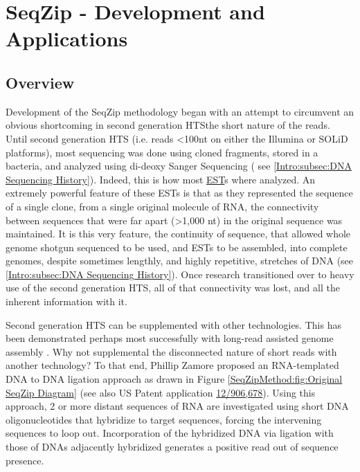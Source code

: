 \chapter{SeqZip - Development and Applications} \label{SeqZipMethod} 
\section{Overview}
  \label{SeqZipMethod:sec:SeqZip Overview}

  Development of the SeqZip methodology began with an attempt to circumvent an obvious shortcoming in second generation HTS\textemdash the short nature of the reads. Until second generation HTS (i.e. reads <100nt on either the Illumina or SOLiD platforms), most sequencing was done using cloned fragments, stored in a bacteria, and analyzed using di-deoxy Sanger Sequencing ( see \ref{Intro:subsec:DNA Sequencing History}). Indeed, this is how most \hyperref[hd:abrevs]{EST}s where analyzed. An extremely powerful feature of these ESTs is that as they represented the sequence of a single clone, from a single original molecule of RNA, the connectivity between sequences that were far apart (>1,000 nt) in the original sequence was maintained. It is this very feature, the continuity of sequence, that allowed whole genome shotgun sequenced to be used, and ESTs to be assembled, into complete genomes, despite sometimes lengthly, and highly repetitive, stretches of DNA (see \ref{Intro:subsec:DNA Sequencing History}). Once research transitioned over to heavy use of the second generation HTS, all of that connectivity was lost, and all the inherent information with it.

  Second generation HTS can be supplemented with other technologies. This has been demonstrated perhaps most successfully with long-read assisted genome assembly \citep{Koren2012a}. Why not supplemental the disconnected nature of short reads with another technology? To that end, Phillip Zamore proposed an RNA-templated DNA to DNA ligation approach as drawn in Figure \ref{SeqZipMethod:fig:Original SeqZip Diagram} (see also US Patent application \href{http://1.usa.gov/PTG9BB}{12/906,678}). Using this approach, 2 or more distant sequences of RNA are investigated using short DNA oligonucleotides that hybridize to target sequences, forcing the intervening sequences to loop out. Incorporation of the hybridized DNA via ligation with those of DNAs adjacently hybridized generates a positive read out of sequence presence.

